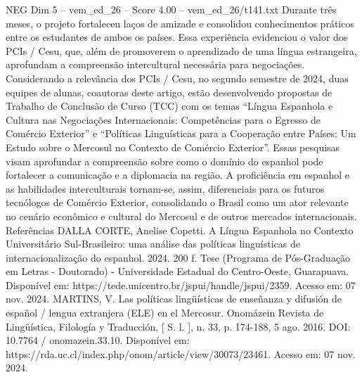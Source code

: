 \begin{textsample}{NEG Dim 5 – vem\_ed\_26 – Score 4.00 – vem\_ed\_26/t141.txt}
Durante três meses, o projeto fortaleceu laços de amizade e consolidou conhecimentos práticos entre os estudantes de ambos os países.
Essa experiência evidenciou o valor dos PCIs / Cesu, que, além de promoverem o aprendizado de uma língua estrangeira, aprofundam a compreensão intercultural necessária para negociações.
Considerando a relevância dos PCIs / Cesu, no segundo semestre de 2024, duas equipes de alunas, coautoras deste artigo, estão desenvolvendo propostas de Trabalho de Conclusão de Curso (TCC) com os temas “Língua Espanhola e Cultura nas Negociações Internacionais: Competências para o Egresso de Comércio Exterior” e “Políticas Linguísticas para a Cooperação entre Países: Um Estudo sobre o Mercosul no Contexto de Comércio Exterior”.
Essas pesquisas visam aprofundar a compreensão sobre como o domínio do espanhol pode fortalecer a comunicação e a diplomacia na região.
A proficiência em espanhol e as habilidades interculturais tornam-se, assim, diferenciais para os futuros tecnólogos de Comércio Exterior, consolidando o Brasil como um ator relevante no cenário econômico e cultural do Mercosul e de outros mercados internacionais.
Referências DALLA CORTE, Anelise Copetti.
A Língua Espanhola no Contexto Universitário Sul-Brasileiro: uma análise das políticas linguísticas de internacionalização do espanhol. 2024. 200 f.
Tese (Programa de Pós-Graduação em Letras - Doutorado) - Universidade Estadual do Centro-Oeste, Guarapuava.
Disponível em: https://tede.unicentro.br/jspui/handle/jspui/2359.
Acesso em: 07 nov. 2024.
MARTINS, V.
Las políticas lingüísticas de enseñanza y difusión de español / lengua extranjera (ELE) en el Mercosur.
Onomázein Revista de Lingüística, Filología y Traducción, [ S. l. ], n. 33, p. 174-188, 5 ago. 2016.
DOI: 10.7764 / onomazein.33.10.
Disponível em: https://rda.uc.cl/index.php/onom/article/view/30073/23461.
Acesso em: 07 nov. 2024.

\end{textsample}
